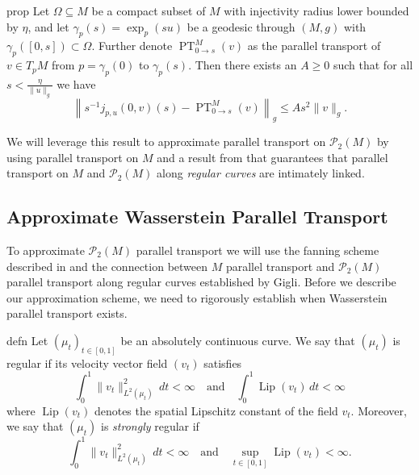 \documentclass[11pt]{article}
\newcommand{\man}{M}
\newcommand{\PT}{\operatorname{PT}}
\begin{document}
\begin{restatable}{prop}{} \label{fanning approximation}
    Let $\Omega \subseteq \man$ be a compact subset of $\man$ with injectivity radius lower bounded by $\eta$, and let $\gamma_p(s) = \exp_p(su)$ be a geodesic through $(\man, g)$ with $\gamma_p([0, s]) \subset \Omega$. Further denote ${\PT}_{0 \rightarrow s}^\man(v)$ as the parallel transport of $v \in T_{p}\man$ from $p = \gamma_p(0)$ to $\gamma_p(s)$. Then there exists an $A \geq 0$ such that for all $s < \frac{\eta}{\|u\|_g}$ we have   
    \[\left\|s^{-1}j_{p, u}(0, v)(s) - {\PT}_{0 \rightarrow s}^\man(v)\right\|_g \leq As^2\|v\|_g. \]
\end{restatable}


We will leverage this result to approximate parallel transport on $\mathcal{P}_2(\man)$ by using parallel transport on $\man$ and a result from \citet{gigli2012second} that guarantees that parallel transport on $\man$ and $\mathcal{P}_2(\man)$ along \textit{regular curves} are intimately linked. 

\subsection{Approximate Wasserstein Parallel Transport}

To approximate $\mathcal{P}_2(\man)$ parallel transport we will use the fanning scheme described in  and the connection between $\man$ parallel transport and $\mathcal{P}_2(\man)$ parallel transport along regular curves established by Gigli. Before we describe our approximation scheme, we need to rigorously establish when Wasserstein parallel transport exists.

\begin{restatable}{defn}{} \label{def: regular curves}
    Let $(\mu_t)_{t \in [0,1]}$ be an absolutely continuous curve. We say that $(\mu_t)$ is regular if its velocity vector field $(v_t)$ satisfies 
    \[\int_0^1\|v_t\|_{L^2(\mu_t)}^2\,dt < \infty \quad \text{and} \quad \int_0^1{\operatorname{Lip}}(v_t)\,dt < \infty\]
    where ${\operatorname{Lip}}(v_t)$ denotes the spatial Lipschitz constant of the field $v_t$. Moreover, we say that $(\mu_t)$ is \textit{strongly} regular if 
    \[\int_0^1\|v_t\|_{L^2(\mu_t)}^2\,dt < \infty \quad \text{and} \quad \sup_{t \in [0,1]}{\operatorname{Lip}}(v_t) < \infty.\]
\end{restatable}
\end{document}
